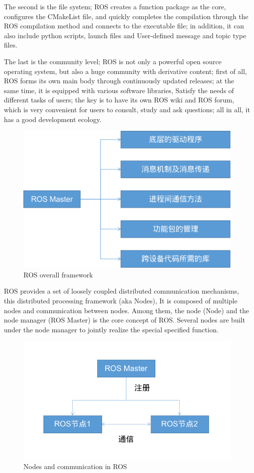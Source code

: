 \documentclass[conference]{IEEEtran}
\begin{document}
The second is the file system; ROS creates a function package as the core, configures the CMakeList file, and quickly completes the compilation through the ROS compilation method and connects to the executable file; in addition, it can also include python scripts, launch files and User-defined message and topic type files.

The last is the community level; ROS is not only a powerful open source operating system, but also a huge community with derivative content; first of all, ROS forms its own main body through continuously updated releases; at the same time, it is equipped with various software libraries, Satisfy the needs of different tasks of users; the key is to have its own ROS wiki and ROS forum, which is very convenient for users to consult, study and ask questions; all in all, it has a good development ecology.

\begin{figure}[htbp]
    \centerline{\includegraphics[width=0.95\columnwidth]{ros.png}}
    \caption{ROS overall framework}
\end{figure}

ROS provides a set of loosely coupled distributed communication mechanisms, this distributed processing framework (aka Nodes),
It is composed of multiple nodes and communication between nodes. Among them, the node (Node) and the node manager (ROS
Master) is the core concept of ROS. Several nodes are built under the node manager to jointly realize the special
specified function.

\begin{figure}[htbp]
    \centerline{\includegraphics[width=0.95\columnwidth]{ros3.png}}
    \caption{Nodes and communication in ROS}
\end{figure}
\end{document}
